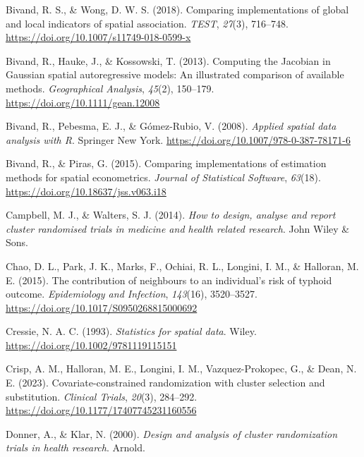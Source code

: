 \documentclass[
  12pt,
  prelim]{bios-prelim}
\newlength{\cslhangindent}
\newenvironment{CSLReferences}[2] %
 {\begin{list}{}{%
  \setlength{\itemindent}{0pt}
  \setlength{\leftmargin}{0pt}
  \setlength{\parsep}{0pt}
  \ifodd #1
   \setlength{\leftmargin}{\cslhangindent}
   \setlength{\itemindent}{-1\cslhangindent}
  \fi
  \setlength{\itemsep}{#2\baselineskip}}}
 {\end{list}}
\begin{document}
\begin{CSLReferences}{1}{0}
Bivand, R. S., \& Wong, D. W. S. (2018). Comparing implementations of
global and local indicators of spatial association. \emph{TEST},
\emph{27}(3), 716--748. \url{https://doi.org/10.1007/s11749-018-0599-x}

Bivand, R., Hauke, J., \& Kossowski, T. (2013). Computing the {Jacobian}
in {Gaussian} spatial autoregressive models: {An} illustrated comparison
of available methods. \emph{Geographical Analysis}, \emph{45}(2),
150--179. \url{https://doi.org/10.1111/gean.12008}

Bivand, R., Pebesma, E. J., \& Gómez-Rubio, V. (2008). \emph{Applied
spatial data analysis with {R}}. Springer New York.
\url{https://doi.org/10.1007/978-0-387-78171-6}

Bivand, R., \& Piras, G. (2015). Comparing implementations of estimation
methods for spatial econometrics. \emph{Journal of Statistical
Software}, \emph{63}(18). \url{https://doi.org/10.18637/jss.v063.i18}

Campbell, M. J., \& Walters, S. J. (2014). \emph{How to design, analyse
and report cluster randomised trials in medicine and health related
research}. John Wiley \& Sons.

Chao, D. L., Park, J. K., Marks, F., Ochiai, R. L., Longini, I. M., \&
Halloran, M. E. (2015). The contribution of neighbours to an
individual's risk of typhoid outcome. \emph{Epidemiology and Infection},
\emph{143}(16), 3520--3527.
\url{https://doi.org/10.1017/S0950268815000692}

Cressie, N. A. C. (1993). \emph{Statistics for spatial data}. Wiley.
\url{https://doi.org/10.1002/9781119115151}

Crisp, A. M., Halloran, M. E., Longini, I. M., Vazquez-Prokopec, G., \&
Dean, N. E. (2023). Covariate-constrained randomization with cluster
selection and substitution. \emph{Clinical Trials}, \emph{20}(3),
284--292. \url{https://doi.org/10.1177/17407745231160556}

Donner, A., \& Klar, N. (2000). \emph{Design and analysis of cluster
randomization trials in health research}. Arnold.


\end{CSLReferences}
\end{document}
